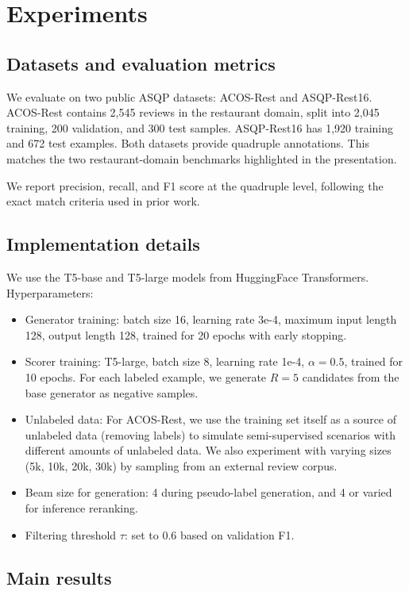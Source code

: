 \documentclass{article}
\begin{document}
\section{Experiments}

\subsection{Datasets and evaluation metrics}

We evaluate on two public ASQP datasets: ACOS-Rest and ASQP-Rest16. ACOS-Rest contains 2,545 reviews in the restaurant domain, split into 2,045 training, 200 validation, and 300 test samples. ASQP-Rest16 has 1,920 training and 672 test examples. Both datasets provide quadruple annotations. This matches the two restaurant-domain benchmarks highlighted in the presentation.

We report precision, recall, and F1 score at the quadruple level, following the exact match criteria used in prior work.

\subsection{Implementation details}

We use the T5-base and T5-large models from HuggingFace Transformers. Hyperparameters:
\begin{itemize}
    \item Generator training: batch size 16, learning rate 3e-4, maximum input length 128, output length 128, trained for 20 epochs with early stopping.
    \item Scorer training: T5-large, batch size 8, learning rate 1e-4, \(\alpha = 0.5\), trained for 10 epochs. For each labeled example, we generate \(R=5\) candidates from the base generator as negative samples.
    \item Unlabeled data: For ACOS-Rest, we use the training set itself as a source of unlabeled data (removing labels) to simulate semi-supervised scenarios with different amounts of unlabeled data. We also experiment with varying sizes (5k, 10k, 20k, 30k) by sampling from an external review corpus.
    \item Beam size for generation: 4 during pseudo-label generation, and 4 or varied for inference reranking.
    \item Filtering threshold \(\tau\): set to 0.6 based on validation F1.
\end{itemize}

\subsection{Main results}
\end{document}
